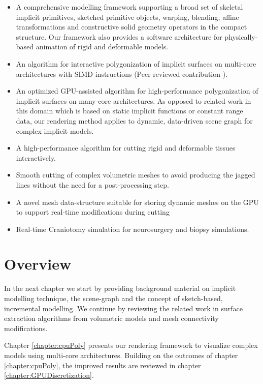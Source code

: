 \begin{itemize}
 \item A comprehensive modelling framework supporting a broad set of skeletal implicit primitives, 
 sketched primitive objects, warping, blending, affine transformations and constructive solid geometry 
 operators in the compact \blob structure. Our framework also provides a software architecture for 
 physically-based animation of rigid and deformable models.
 
 \item An algorithm for interactive polygonization of implicit surfaces on multi-core architectures with 
 SIMD instructions (Peer reviewed contribution \cite{Shirazian2012}). 
 
 \item An optimized GPU-assisted algorithm for high-performance polygonization of implicit surfaces 
 on many-core architectures. As opposed to related work in this domain which is based on static implicit
 functions or constant range data, our rendering method applies to dynamic, data-driven \blob scene graph
 for complex implicit models. 
  
 \item A high-performance algorithm for cutting rigid and deformable tissues interactively. 
 
 \item Smooth cutting of complex volumetric meshes to avoid producing the jagged lines without the 
 need for a post-processing step.

 \item A novel mesh data-structure suitable for storing dynamic meshes on the GPU to support real-time 
 modifications during cutting
 
\item Real-time Craniotomy simulation for neurosurgery and biopsy simulations.

\end{itemize}


\section{Overview}
In the next chapter we start by providing background material on implicit modelling technique, the 
\blob scene-graph and the concept of sketch-based, incremental modelling.
We continue by reviewing the related work in surface extraction algorithms from volumetric models and
mesh connectivity modifications. 

Chapter \ref{chapter:cpuPoly} presents our rendering framework to visualize complex \blob models using 
multi-core architectures. Building on the outcomes of chapter \ref{chapter:cpuPoly}, the improved results 
are reviewed in chapter \ref{chapter:GPUDiscretization}. 

